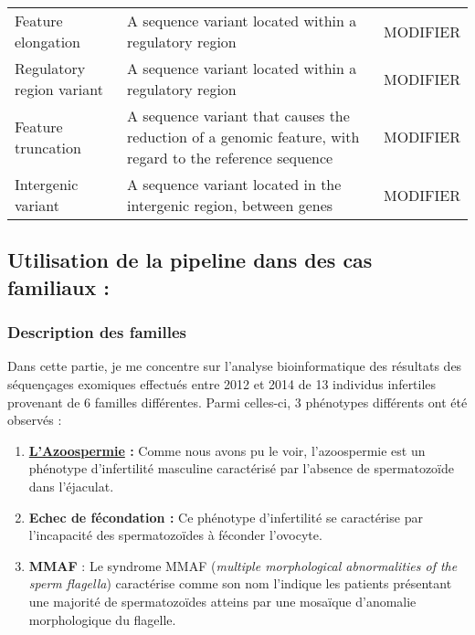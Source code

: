 \documentclass[12pt,twoside]{reedthesis}
\providecommand{\tightlist}{%
  \setlength{\itemsep}{0pt}\setlength{\parskip}{0pt}}
\theoremstyle{definition}
\theoremstyle{definition}
\theoremstyle{remark}
\begin{document}
\begin{table}
\begin{tabular}[t]{lll}
  Feature elongation & A sequence variant located within a regulatory region & MODIFIER\\
  Regulatory region variant & A sequence variant located within a regulatory region & MODIFIER\\
  Feature truncation & A sequence variant that causes the reduction of a genomic feature, with regard to the reference sequence & MODIFIER\\
  Intergenic variant & A sequence variant located in the intergenic region, between genes & MODIFIER\\
  \bottomrule
  \end{tabular}
  \end{table}
  
  \newpage       
  
  \subsection{Utilisation de la pipeline dans des cas familiaux
  :}\label{utilisation-de-la-pipeline-dans-des-cas-familiaux}
  
  \subsubsection{Description des familles}\label{description-des-familles}
  
  Dans cette partie, je me concentre sur l'analyse bioinformatique des
  résultats des séquençages exomiques effectués entre 2012 et 2014 de 13
  individus infertiles provenant de 6 familles différentes. Parmi
  celles-ci, 3 phénotypes différents ont été observés :
  
  \begin{enumerate}
  \def\labelenumi{\arabic{enumi}.}
  \tightlist
  \item
    \textbf{\protect\hyperlink{infquant}{L'Azoospermie} :} Comme nous
    avons pu le voir, l'azoospermie est un phénotype d'infertilité
    masculine caractérisé par l'absence de spermatozoïde dans
    l'éjaculat.\\
  \item
    \textbf{Echec de fécondation :} Ce phénotype d'infertilité se
    caractérise par l'incapacité des spermatozoïdes à féconder
    l'ovocyte.\\
  \item
    \textbf{MMAF} : Le syndrome MMAF (\emph{multiple morphological
    abnormalities of the sperm flagella}) caractérise comme son nom
    l'indique les patients présentant une majorité de spermatozoïdes
    atteins par une mosaïque d'anomalie morphologique du flagelle.
  \end{enumerate}
  
\end{document}
